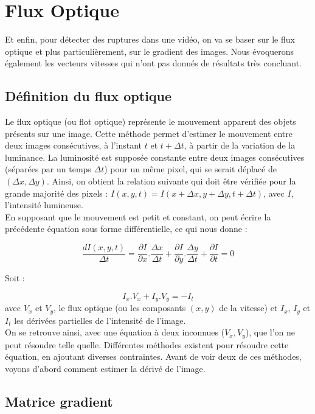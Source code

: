 \section{Flux Optique}

Et enfin, pour détecter des ruptures dans une vidéo, on va se baser sur le flux optique et plus particulièrement, sur le gradient des images. Nous évoquerons également les vecteurs vitesses qui n'ont pas donnés de résultats très concluant.

\subsection{Définition du flux optique}

Le flux optique (ou flot optique) représente le mouvement apparent des objets présents sur une image. Cette méthode permet d'estimer le mouvement entre deux images consécutives, à l'instant $t$ et $t + \Delta t$, à partir de la variation de la luminance. La luminosité est supposée constante entre deux images consécutives (séparées par un temps $\Delta t$) pour un même pixel, qui se serait déplacé de $(\Delta x, \Delta y)$. Ainsi, on obtient la relation suivante qui doit être vérifiée pour la grande majorité des pixels : $I(x, y, t) = I(x + \Delta x, y + \Delta y, t + \Delta t)$, avec $I$, l'intensité lumineuse.\\

En supposant que le mouvement est petit et constant, on peut écrire la précédente équation sous forme différentielle, ce qui nous donne : 

\[
	\frac{dI(x, y, t)}{\Delta t} = \frac{\partial I}{\partial x}.\frac{\Delta x}{\Delta t} + \frac{\partial I}{\partial y}.\frac{\Delta y}{\Delta t} + \frac{\partial I}{\partial t} = 0
\]

Soit :

\[
	I_x.V_x + I_y.V_y = -I_t
\]
avec $V_x$ et $V_y$, le flux optique (ou les composants $(x, y)$ de la vitesse) et $I_x$, $I_y$ et $I_t$ les dérivées partielles de l'intensité de l'image.\\

On se retrouve ainsi, avec une équation à deux inconnues ($V_x, V_y$), que l'on ne peut résoudre telle quelle. Différentes méthodes existent pour résoudre cette équation, en ajoutant diverses contraintes. Avant de voir deux de ces méthodes, voyons d'abord comment estimer la dérivé de l'image.

\subsection{Matrice gradient}

